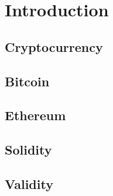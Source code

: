 \chapter{Introduction}
\label{introduction}

\section{Cryptocurrency}

\section{Bitcoin}

\section{Ethereum}

\section{Solidity}

\section{Validity}
